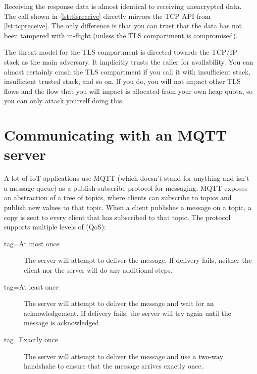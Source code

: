 {\codelisting[filename=examples/tls/https.cc,marker=send,label=lst:tlssend,caption="Sending data over a TLS connection."]{}

Receiving the response data is almost identical to receiving unencrypted data.
The call shown in \ref{lst:tlsreceive} directly mirrors the TCP API from \ref{lst:tcpreceive}.
The only difference is that you can trust that the data has not been tampered with in-flight (unless the TLS compartment is compromised).

\codelisting[filename=examples/tls/https.cc,marker=receive,label=lst:tlsreceive,caption="Receiving data over a TLS connection."]{}

\begin{caution}
The threat model for the TLS compartment is directed towards the TCP/IP stack as the main adversary.
It implicitly trusts the caller for availability.
You can almost certainly crash the TLS compartment if you call it with insufficient stack, insufficient trusted stack, and so on.
If you do, you will not impact other TLS flows and the flow that you will impact is allocated from your own heap quota, so you can only attack yourself doing this.
\end{caution}

\section[label=mqtt]{Communicating with an MQTT server}

A lot of IoT applications use MQTT (which doesn't stand for anything and isn't a message queue) as a publish-subscribe protocol for messaging.
MQTT exposes an abstraction of a tree of topics, where clients can subscribe to topics and publish new values to that topic.
When a client publishes a message on a topic, a copy is sent to every client that has subscribed to that topic.
The protocol supports multiple levels of  (QoS):

\begin{description}
\item[tag=At most once]{The server will attempt to deliver the message.
	If delivery fails, neither the client nor the server will do any additional steps.}
\item[tag=At least once]{The server will attempt to deliver the message and wait for an acknowledgement.
	If delivery fails, the server will try again until the message is acknowledged.}
\item[tag=Exactly once]{The server will attempt to deliver the message and use a two-way handshake to ensure that the message arrives exactly once.}
\end{description}

}
